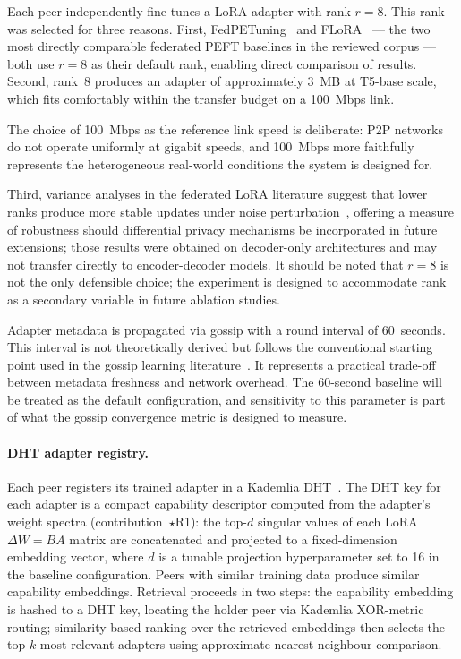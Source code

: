 Each peer independently fine-tunes a LoRA adapter with rank $r = 8$. This rank 
was selected for three reasons. First, FedPETuning~\citep{ZhangFedPETuning2023} 
and FLoRA~\citep{WangFLoRA2024} --- the two most directly comparable federated 
PEFT baselines in the reviewed corpus --- both use $r = 8$ as their default rank, 
enabling direct comparison of results. Second, rank~8 produces an adapter of 
approximately 3~MB at T5-base scale, which fits comfortably within the transfer 
budget on a 100~Mbps link. 

The choice of 100~Mbps as the reference link speed is 
deliberate: P2P networks do not operate uniformly at gigabit speeds, and 100~Mbps 
more faithfully represents the heterogeneous real-world conditions the system is 
designed for. 

Third, variance analyses in the federated LoRA literature suggest that lower ranks produce more stable updates under noise perturbation~\citep{XuDPFedLoRA2025}, offering a measure of robustness should 
differential privacy mechanisms be incorporated in future extensions; those results 
were obtained on decoder-only architectures and may not transfer directly to 
encoder-decoder models. It should be noted that $r = 8$ is not the only defensible 
choice; the experiment is designed to accommodate rank as a secondary variable in 
future ablation studies.

Adapter metadata is propagated via gossip with a round interval of 60~seconds. 
This interval is not theoretically derived but follows the conventional starting 
point used in the gossip learning literature~\citep{HegeduisGossip2019}. It 
represents a practical trade-off between metadata freshness and network overhead. 
The 60-second baseline will be treated as the default configuration, and 
sensitivity to this parameter is part of what the gossip convergence metric is 
designed to measure.


\paragraph{DHT adapter registry.}
Each peer registers its trained adapter in a Kademlia 
DHT~\citep{MaymounkovKademlia2002}. The DHT key for each adapter is a compact 
capability descriptor computed from the adapter's weight spectra 
(contribution~$\star$R1): the top-$d$ singular values of each LoRA $\Delta W = BA$ 
matrix are concatenated and projected to a fixed-dimension embedding vector, where 
$d$ is a tunable projection hyperparameter set to 16 in the baseline configuration. 
Peers with similar training data produce similar capability embeddings. Retrieval 
proceeds in two steps: the capability embedding is hashed to a DHT key, locating 
the holder peer via Kademlia XOR-metric routing; similarity-based ranking over 
the retrieved embeddings then selects the top-$k$ most relevant adapters using 
approximate nearest-neighbour comparison.

